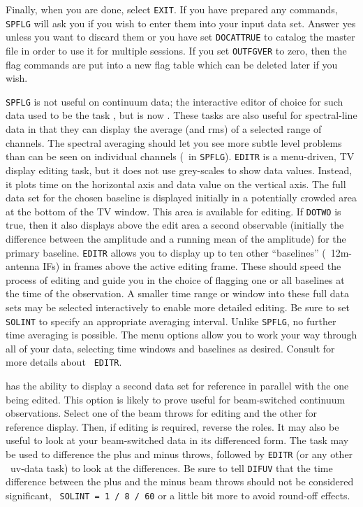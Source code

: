      Finally, when you are done, select \hbox{{\tt EXIT}}.  If you
have prepared any  commands, {\tt SPFLG} will ask you
if you wish to enter them into your input data set.  Answer yes unless
you want to discard them or you have set {\tt DOCAT\qs TRUE} to
catalog the master file in order to use it for multiple sessions.  If
you set {\tt OUTFGVER} to zero, then the flag commands are put into a
new flag table which can be deleted later if you wish.

     {\tt SPFLG} is not useful on continuum data; the interactive
editor of choice for such data used to be the task {\tt {}},
but is now \hbox{{\tt {}}}.  These tasks are also useful for
spectral-line data in that they can display the average (and rms) of a
selected range of channels.  The spectral averaging should let you see
more subtle level problems  than can be seen on individual channels
(\ie\ in \hbox{{\tt SPFLG}}).  {\tt EDITR} is a menu-driven, TV
display editing task, but it does not use grey-scales to show data
values.  Instead, it plots time on the horizontal axis and data value
on the vertical axis.  The full data set for the chosen baseline is
displayed initially in a potentially crowded area at the bottom of the
TV window.  This area is available for editing.  If {\tt DOTWO} is
true, then it also displays above the edit area a second observable
(initially the difference between the amplitude and a running mean of
the amplitude) for the primary baseline. {\tt EDITR} allows you to
display up to ten other ``baselines'' (\eg\ 12m-antenna IFs) in frames
above the active editing frame.  These should speed the process of
editing and guide you in the choice of flagging one or all baselines
at the time of the observation.  A smaller time range or window into
these full data sets may be selected interactively to enable more
detailed editing.  Be sure to set {\tt SOLINT} to specify an
appropriate averaging interval.  Unlike {\tt SPFLG}, no further time
averaging is possible.  The menu options allow you to work your way
through all of your data, selecting time windows and baselines as
desired.  Consult  for more details about \hbox{{\tt
EDITR}}.

     {\tt {}} has the ability to display a second data set
for reference in parallel with the one being edited.  This option is
likely to prove useful for beam-switched continuum observations.
Select one of the beam throws for editing and the other for reference
display.  Then, if editing is required, reverse the roles.  It may
also be useful to look at your beam-switched data in its differenced
form.  The task {\tt {}} may be used to difference the plus
and minus throws, followed by {\tt EDITR} (or any other \AIPS\ uv-data
task) to look at the differences.  Be sure to tell {\tt DIFUV} that
the time difference between the plus and the minus beam throws should
not be considered significant, \ie\ {\tt SOLINT = 1 / 8 / 60} or a
little bit more to avoid round-off effects.

